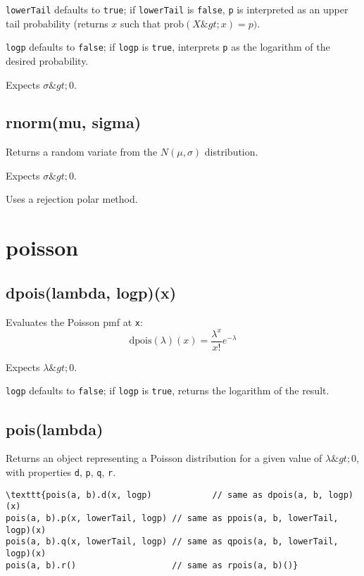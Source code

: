 \documentclass{article}
\begin{document}
\texttt{lowerTail} defaults to \texttt{true}; if \texttt{lowerTail} is \texttt{false}, \texttt{p} is
interpreted as an upper tail probability (returns
$x$ such that $\textrm{prob}(X \&gt; x) = p)$.


\texttt{logp} defaults to \texttt{false}; if \texttt{logp} is \texttt{true}, interprets \texttt{p} as
the logarithm of the desired probability.


Expects $\sigma \&gt; 0$.


    \subsection*{rnorm(mu, sigma)}
    Returns a random variate from the $N(\mu, \sigma)$ distribution.


Expects $\sigma \&gt; 0$.


Uses a rejection polar method.


  \section{poisson}
    \subsection*{dpois(lambda, logp)(x)}
    Evaluates the Poisson pmf at \texttt{x}:
$$\textrm{dpois}(\lambda)(x) = \frac{\lambda^x}{x!}e^{-\lambda}$$


Expects $\lambda \&gt; 0$.


\texttt{logp} defaults to \texttt{false}; if \texttt{logp} is \texttt{true}, returns the
logarithm of the result.


    \subsection*{pois(lambda)}
    Returns an object representing a Poisson distribution
for a given value of $\lambda \&gt; 0$, with properties \texttt{d}, \texttt{p}, \texttt{q}, \texttt{r}.


\begin{lstlisting}
\texttt{pois(a, b).d(x, logp)            // same as dpois(a, b, logp)(x)
pois(a, b).p(x, lowerTail, logp) // same as ppois(a, b, lowerTail, logp)(x)
pois(a, b).q(x, lowerTail, logp) // same as qpois(a, b, lowerTail, logp)(x)
pois(a, b).r()                   // same as rpois(a, b)()}\end{lstlisting}
\end{document}
